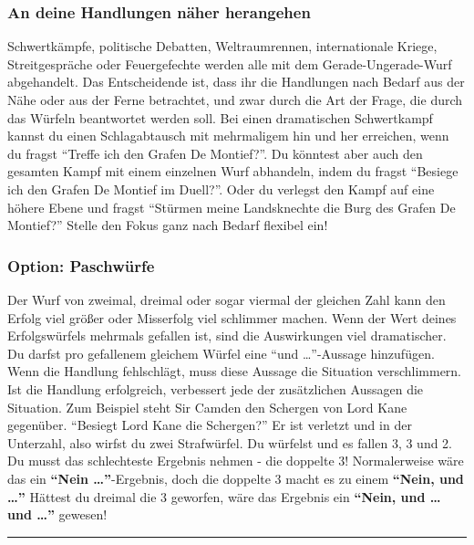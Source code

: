 \documentclass[]{article}
\begin{document}
\subsubsection{An deine Handlungen näher
herangehen}\label{an-deine-handlungen-nuxe4her-herangehen}

Schwertkämpfe, politische Debatten, Weltraumrennen, internationale
Kriege, Streitgespräche oder Feuergefechte werden alle mit dem
Gerade-Ungerade-Wurf abgehandelt. Das Entscheidende ist, dass ihr die
Handlungen nach Bedarf aus der Nähe oder aus der Ferne betrachtet, und
zwar durch die Art der Frage, die durch das Würfeln beantwortet werden
soll. Bei einen dramatischen Schwertkampf kannst du einen Schlagabtausch
mit mehrmaligem hin und her erreichen, wenn du fragst ``Treffe ich den
Grafen De Montief?''. Du könntest aber auch den gesamten Kampf mit einem
einzelnen Wurf abhandeln, indem du fragst ``Besiege ich den Grafen De
Montief im Duell?''. Oder du verlegst den Kampf auf eine höhere Ebene
und fragst ``Stürmen meine Landsknechte die Burg des Grafen De
Montief?'' Stelle den Fokus ganz nach Bedarf flexibel ein!

\subsubsection{Option: Paschwürfe}\label{option-paschwuxfcrfe}

Der Wurf von zweimal, dreimal oder sogar viermal der gleichen Zahl kann
den Erfolg viel größer oder Misserfolg viel schlimmer machen. Wenn der
Wert deines Erfolgswürfels mehrmals gefallen ist, sind die Auswirkungen
viel dramatischer. Du darfst pro gefallenem gleichem Würfel eine ``und
\ldots{}''-Aussage hinzufügen. Wenn die Handlung fehlschlägt, muss diese
Aussage die Situation verschlimmern. Ist die Handlung erfolgreich,
verbessert jede der zusätzlichen Aussagen die Situation. Zum Beispiel
steht Sir Camden den Schergen von Lord Kane gegenüber. ``Besiegt Lord
Kane die Schergen?'' Er ist verletzt und in der Unterzahl, also wirfst
du zwei Strafwürfel. Du würfelst und es fallen 3, 3 und 2. Du musst das
schlechteste Ergebnis nehmen - die doppelte 3! Normalerweise wäre das
ein \textbf{``Nein \ldots{}''}-Ergebnis, doch die doppelte 3 macht es zu
einem \textbf{``Nein, und \ldots{}''} Hättest du dreimal die 3 geworfen,
wäre das Ergebnis ein \textbf{``Nein, und \ldots{} und \ldots{}''}
gewesen!

\begin{center}\rule{0.5\linewidth}{\linethickness}\end{center}
\end{document}
